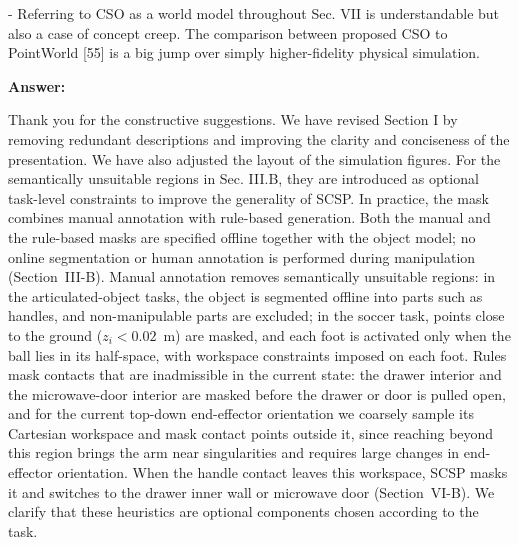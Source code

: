 \documentclass[journal,10pt]{IEEEtran}
\newcommand{\answer}{\par\smallskip\noindent\color{black}\textbf{Answer: }\ignorespaces
}
\begin{document}
- Referring to CSO as a world model throughout Sec. VII is
understandable but also a case of concept creep. The comparison between
proposed CSO to PointWorld [55] is a big jump over simply
higher-fidelity physical simulation.

\answer
Thank you for the constructive suggestions. We have revised Section I by
removing redundant descriptions and improving the clarity and conciseness of
the presentation. We have also adjusted the layout of the simulation figures.
For the semantically unsuitable regions in Sec. III.B, they are introduced as
optional task-level constraints to improve the generality of SCSP.
In practice, the mask combines manual annotation with rule-based generation. Both the manual and the rule-based masks are specified offline together with the object model; no online segmentation or human annotation is performed during manipulation (Section~III-B). Manual annotation removes semantically unsuitable regions: in the articulated-object tasks, the object is segmented offline into parts such as handles, and non-manipulable parts are excluded; in the soccer task, points close to the ground ($z_i<0.02$~m) are masked, and each foot is activated only when the ball lies in its half-space, with workspace constraints imposed on each foot. Rules mask contacts that are inadmissible in the current state: the drawer interior and the microwave-door interior are masked before the drawer or door is pulled open, and for the current top-down end-effector orientation we coarsely sample its Cartesian workspace and mask contact points outside it, since reaching beyond this region brings the arm near singularities and requires large changes in end-effector orientation. When the handle contact leaves this workspace, SCSP masks it and switches to the drawer inner wall or microwave door (Section~VI-B).
We clarify that these heuristics are optional components chosen according to the task.
\end{document}
